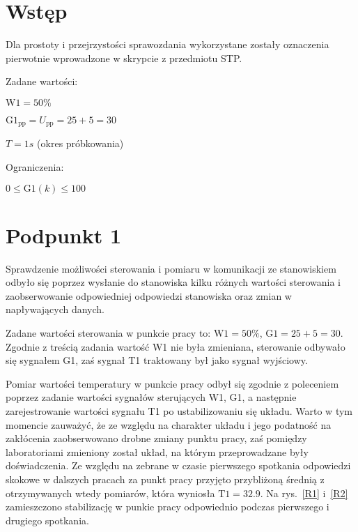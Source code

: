 \chapter{Wstęp}
Dla prostoty i przejrzystości sprawozdania wykorzystane zostały oznaczenia pierwotnie wprowadzone w skrypcie z przedmiotu STP\@.

\bigskip

Zadane wartości:

\smallskip

$\mathrm{W1}=50\%$

\smallskip

$\mathrm{G1}_{\mathrm{pp}}=U_{\mathrm{pp}}=25+5=30$

\smallskip

$T=1s$ (okres próbkowania)

\bigskip

Ograniczenia:

\smallskip

$0 \le \mathrm{G1}(k) \le 100$

\chapter{Podpunkt 1}
Sprawdzenie możliwości sterowania i pomiaru w komunikacji ze stanowiskiem odbyło się poprzez wysłanie do stanowiska kilku różnych wartości sterowania i zaobserwowanie odpowiedniej odpowiedzi stanowiska oraz zmian w napływających danych.

Zadane wartości sterowania w punkcie pracy to: $\mathrm{W1}=50\%$, $\mathrm{G1}=25+5=30$. Zgodnie z treścią zadania wartość W1 nie była zmieniana, sterowanie odbywało się sygnałem G1, zaś sygnał T1 traktowany był jako sygnał wyjściowy.

Pomiar wartości temperatury w punkcie pracy odbył się zgodnie z poleceniem poprzez zadanie wartości sygnałów sterujących W1, G1, a następnie zarejestrowanie wartości sygnału T1 po ustabilizowaniu się układu. Warto w tym momencie zauważyć, że ze względu na charakter układu i jego podatność na zakłócenia zaobserwowano drobne zmiany punktu pracy, zaś pomiędzy laboratoriami zmieniony został układ, na którym przeprowadzane były doświadczenia. Ze względu na zebrane w czasie pierwszego spotkania odpowiedzi skokowe w dalszych pracach za punkt pracy przyjęto przybliżoną średnią z otrzymywanych wtedy pomiarów, która wyniosła $\mathrm{T1}=\num{32,9}$. Na rys.~\ref{R1} i~\ref{R2} zamieszczono stabilizację w punkie pracy odpowiednio podczas pierwszego i drugiego spotkania.

